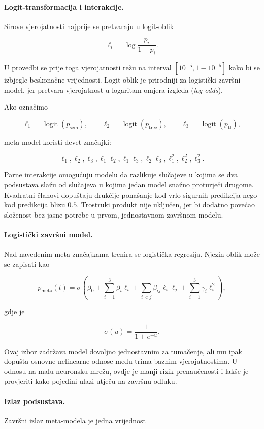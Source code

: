 \documentclass{article}
\begin{document}
\paragraph{Logit-transformacija i interakcije.}
Sirove vjerojatnosti najprije se pretvaraju u logit-oblik

\[
\ell_i = \log\frac{p_i}{1-p_i}.
\]

U provedbi se prije toga vjerojatnosti režu na interval $[10^{-5},1-10^{-5}]$ kako bi se izbjegle beskonačne vrijednosti. Logit-oblik je prirodniji za logistički završni model, jer pretvara vjerojatnost u logaritam omjera izgleda (\textit{log-odds}).

Ako označimo

\[
\ell_1=\operatorname{logit}(p_{\mathrm{sem}}),
\qquad
\ell_2=\operatorname{logit}(p_{\mathrm{tree}}),
\qquad
\ell_3=\operatorname{logit}(p_{\mathrm{tf}}),
\]

meta-model koristi devet značajki:

\[
\ell_1,
\ell_2,
\ell_3,
\ell_1\ell_2,
\ell_1\ell_3,
\ell_2\ell_3,
\ell_1^2,
\ell_2^2,
\ell_3^2.
\]

Parne interakcije omogućuju modelu da razlikuje slučajeve u kojima se dva podsustava slažu od slučajeva u kojima jedan model snažno proturječi drugome. Kvadratni članovi dopuštaju drukčije ponašanje kod vrlo sigurnih predikcija nego kod predikcija blizu $0.5$. Trostruki produkt nije uključen, jer bi dodatno povećao složenost bez jasne potrebe u prvom, jednostavnom završnom modelu.

\paragraph{Logistički završni model.}
Nad navedenim meta-značajkama trenira se logistička regresija. Njezin oblik može se zapisati kao

\[
p_{\mathrm{meta}}(t)=\sigma\left(
\beta_0
+\sum_{i=1}^{3}\beta_i\ell_i
+\sum_{i<j}\beta_{ij}\ell_i\ell_j
+\sum_{i=1}^{3}\gamma_i\ell_i^2
\right),
\]

gdje je

\[
\sigma(u)=\frac{1}{1+e^{-u}}.
\]

Ovaj izbor zadržava model dovoljno jednostavnim za tumačenje, ali mu ipak dopušta osnovne nelinearne odnose među trima baznim vjerojatnostima. U odnosu na malu neuronsku mrežu, ovdje je manji rizik prenaučenosti i lakše je provjeriti kako pojedini ulazi utječu na završnu odluku.

\paragraph{Izlaz podsustava.}
Završni izlaz meta-modela je jedna vrijednost
\end{document}
